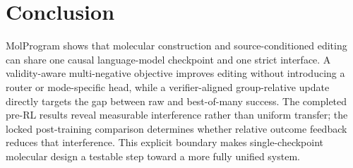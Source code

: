 \documentclass{article}
\begin{document}
\section{Conclusion}
MolProgram shows that molecular construction and source-conditioned editing
can share one causal language-model checkpoint and one strict interface. A
validity-aware multi-negative objective improves editing without introducing a
router or mode-specific head, while a verifier-aligned group-relative update
directly targets the gap between raw and best-of-many success. The completed
pre-RL results reveal measurable interference rather than uniform transfer;
the locked post-training comparison determines whether relative outcome
feedback reduces that interference. This explicit boundary makes
single-checkpoint molecular design a testable step toward a more fully unified
system.

\appendix




\end{document}

